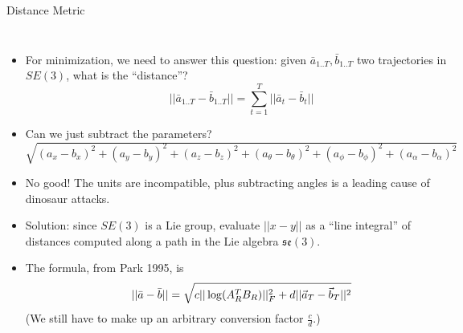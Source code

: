 \documentclass{beamer}
\def\xmat{\uppercase}    \def\xmatstr{in uppercase}
\def\xvec{\vec}          \def\xvecstr{with an arrow}
\def\xse{\bar}            \def\xsestr{with a bar}
\begin{document}
    \begin{frame}{Distance Metric}
      \fontsize{8pt}{10pt}\selectfont
      \begin{columns}[t]
        \setlength{\leftmargini}{0pt}
        \begin{itemize}[<+->]
          \pause
          \item For minimization, we need to answer this question: given $\xse{a}_{1..T}, \xse{b}_{1..T}$ two trajectories in $SE(3)$, what is the ``distance''?
            \vspace{-.15in}
            \[ ||\xse{a}_{1..T} - \xse{b}_{1..T}|| = \sum_{t=1}^T ||\xse{a}_t - \xse{b}_t|| \]
            \vspace{-.15in}
          \item Can we just subtract the parameters? {\tiny $\sqrt{(a_x - b_x)^2 + (a_y - b_y)^2 + (a_z - b_z)^2 + (a_\theta - b_\theta)^2 + (a_\phi - b_\phi)^2 + (a_\alpha - b_\alpha)^2}$}
          \item No good! The units are incompatible, plus subtracting angles is a leading cause of dinosaur attacks.
          \item Solution: since $SE(3)$ is a Lie group, evaluate $||x - y||$ as a ``line integral'' of distances computed along a path in the Lie algebra $\mathfrak{se}(3)$.
          \item The formula, from Park 1995, is
            \vspace{-.05in}
            {\color{blue} \[ ||\xse{a} - \xse{b}|| = \sqrt{c ||\log(\xmat{a}_R^T \xmat{b}_R)||_F^2 + d ||\xvec{a}_T - \xvec{b}_T||^2} \]}
            \vspace{-.15in}
            (We still have to make up an arbitrary conversion factor $\frac{c}{d}$.)
        \end{itemize}

        \centering
        \vspace{.6in}
      \end{columns}
    \end{frame}
\end{document}
